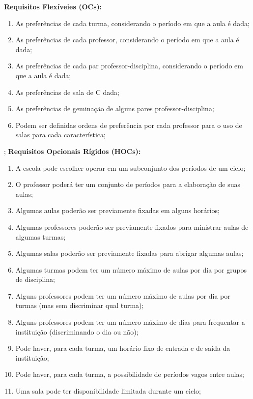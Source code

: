 \documentclass[12pt,a4paper]{article}
\begin{document}
			\textbf{Requisitos Flexíveies (OCs):}
			\begin{enumerate}
				\item As preferências de cada turma, considerando o período em que a aula é dada;
				\item As preferências de cada professor, considerando o período em que a aula é dada;
				\item As preferências de cada par professor-disciplina, considerando o período em que a aula é dada;
				\item As preferências de sala de C dada;
				\item As preferências de geminação de alguns pares professor-disciplina;
				\item Podem ser definidas ordens de preferência por cada professor para o uso de salas para cada característica;
			\end{enumerate}
;
			\textbf{Requisitos Opcionais Rígidos (HOCs):}
			\begin{enumerate}
				\item A escola pode escolher operar em um subconjunto dos períodos de um ciclo;
				\item O professor poderá ter um conjunto de períodos para a elaboração de suas aulas;
				\item Algumas aulas poderão ser previamente fixadas em alguns horários;
				\item Algumas professores poderão ser previamente fixados para ministrar aulas de algumas turmas;
				\item Algumas salas poderão ser previamente fixadas para abrigar algumas aulas;
				\item Algumas turmas podem ter um número máximo de aulas por dia por grupos de disciplina;
				\item Alguns professores podem ter um número máximo de aulas por dia por turmas (mas sem discriminar qual turma);
				\item Alguns professores podem ter um número máximo de dias para frequentar a instituição (discriminando o dia ou não);
				\item Pode haver, para cada turma, um horário fixo de entrada e de saída da instituição;
				\item Pode haver, para cada turma, a possibilidade de períodos vagos entre aulas;
				\item Uma sala pode ter disponibilidade limitada durante um ciclo;


			\end{enumerate}
\end{document}
